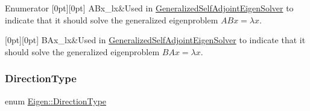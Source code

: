 \begin{DoxyEnumFields}{Enumerator}
[0pt][0pt]{}\mbox{\label{group__enums_ggae3e239fb70022eb8747994cf5d68b4a9a9a7d9813cec527e299a36b749b0f7e1e}} 
A\+Bx\+\_\+lx&Used in \mbox{\hyperlink{class_eigen_1_1_generalized_self_adjoint_eigen_solver}{Generalized\+Self\+Adjoint\+Eigen\+Solver}} to indicate that it should solve the generalized eigenproblem $ ABx = \lambda x $. \\
\hline

[0pt][0pt]{}\mbox{\label{group__enums_ggae3e239fb70022eb8747994cf5d68b4a9a9870817d373c41ba0dc7f6b5ab0895b8}} 
B\+Ax\+\_\+lx&Used in \mbox{\hyperlink{class_eigen_1_1_generalized_self_adjoint_eigen_solver}{Generalized\+Self\+Adjoint\+Eigen\+Solver}} to indicate that it should solve the generalized eigenproblem $ BAx = \lambda x $. \\
\hline

\end{DoxyEnumFields}
\mbox{\label{group__enums_gad49a7b3738e273eb00932271b36127f7}} 
\subsubsection{\texorpdfstring{DirectionType}{DirectionType}}
{\footnotesize\ttfamily enum \mbox{\hyperlink{group__enums_gad49a7b3738e273eb00932271b36127f7}{Eigen\+::\+Direction\+Type}}}

